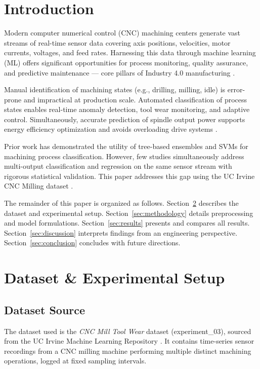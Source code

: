 \documentclass[conference]{IEEEtran}
\begin{document}
\section{Introduction}

Modern computer numerical control (CNC) machining centers generate vast streams of
real-time sensor data covering axis positions, velocities, motor currents, voltages,
and feed rates. Harnessing this data through machine learning (ML) offers significant
opportunities for process monitoring, quality assurance, and predictive maintenance
— core pillars of Industry 4.0 manufacturing \cite{ref1}.

Manual identification of machining states (e.g., drilling, milling, idle) is error-prone
and impractical at production scale. Automated classification of process states enables
real-time anomaly detection, tool wear monitoring, and adaptive control. Simultaneously,
accurate prediction of spindle output power supports energy efficiency optimization and
avoids overloading drive systems \cite{ref2}.

Prior work has demonstrated the utility of tree-based ensembles \cite{ref3} and SVMs
\cite{ref4} for machining process classification. However, few studies simultaneously
address multi-output classification and regression on the same sensor stream with
rigorous statistical validation. This paper addresses this gap using the UC Irvine
CNC Milling dataset \cite{ref5}.

The remainder of this paper is organized as follows. Section~\ref{sec:dataset} describes
the dataset and experimental setup. Section~\ref{sec:methodology} details preprocessing
and model formulations. Section~\ref{sec:results} presents and compares all results.
Section~\ref{sec:discussion} interprets findings from an engineering perspective.
Section~\ref{sec:conclusion} concludes with future directions.

\section{Dataset \& Experimental Setup}
\label{sec:dataset}

\subsection{Dataset Source}

The dataset used is the \textit{CNC Mill Tool Wear} dataset (experiment\_03), sourced
from the UC Irvine Machine Learning Repository \cite{ref5}. It contains time-series
sensor recordings from a CNC milling machine performing multiple distinct machining
operations, logged at fixed sampling intervals.
\end{document}
